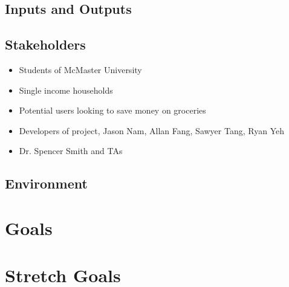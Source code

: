 \documentclass{article}
\begin{document}
\subsection{Inputs and Outputs}


\subsection{Stakeholders}

\begin{itemize}
    \item Students of McMaster University
    \item Single income households
    \item Potential users looking to save money on groceries
    \item Developers of project, Jason Nam, Allan Fang, Sawyer Tang, Ryan Yeh
    \item Dr. Spencer Smith and TAs
\end{itemize}

\subsection{Environment}


\section{Goals}

\section{Stretch Goals}
\end{document}
